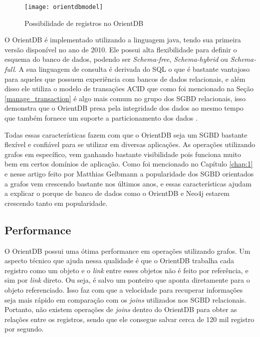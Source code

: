 \begin{figure}[h]
	\centering
    \texttt{[image: orientdbmodel]}
    \caption{Possibilidade de registros no OrientDB}
    \label{fig:orientdbpossibilities}
\end{figure}
	
	O OrientDB é implementado utilizando a linguagem java, tendo sua primeira versão disponível no ano de 2010. Ele possui alta flexibilidade para definir o esquema do banco de dados, podendo ser \textit{Schema-free}, \textit{Schema-hybrid} ou \textit{Schema-full}. A sua linguagem de consulta é derivada do SQL o que é bastante vantajoso para aqueles que possuem experiência com bancos de dados relacionais, e além disso ele utiliza o modelo de transações ACID que como foi mencionado na Seção \ref{manage_transaction} é algo mais comum no grupo dos SGBD relacionais, isso demonstra que o OrientDB presa pela integridade dos dados ao mesmo tempo que também fornece um suporte a particionamento dos dados \cite{OrientDB} \cite{vschart}.
	
	Todas essas características fazem com que o OrientDB seja um SGBD bastante flexível e confiável para se utilizar em diversas aplicações. As operações utilizando grafos em específico, vem ganhando bastante visibilidade pois funciona muito bem em certos domínios de aplicação. Como foi mencionado no Capítulo \ref{chap:1} e nesse artigo feito por Matthias Gelbmann \cite{Graphpopularity} a popularidade dos SGBD orientados a grafos vem crescendo bastante nos últimos anos, e essas características ajudam a explicar o porque de banco de dados como o OrientDB e Neo4j estarem crescendo tanto em popularidade.
	
\subsection{Performance} \label{orient_performance}
	O OrientDB possui uma ótima performance em operações utilizando grafos. Um aspecto técnico que ajuda nessa qualidade é que o OrientDB trabalha cada registro como um objeto e o \textit{link} entre esses objetos não é feito por referência, e sim por \textit{link} direto. Ou seja, é salvo um ponteiro que aponta diretamente para o objeto referenciado. Isso faz com que a velocidade para recuperar informações seja mais rápido em comparação com os \textit{joins} utilizados nos SGBD relacionais. Portanto, não existem operações de \textit{joins} dentro do OrientDB para obter as relações entre os registros, sendo que ele consegue salvar cerca de 120 mil registro por segundo.
	
